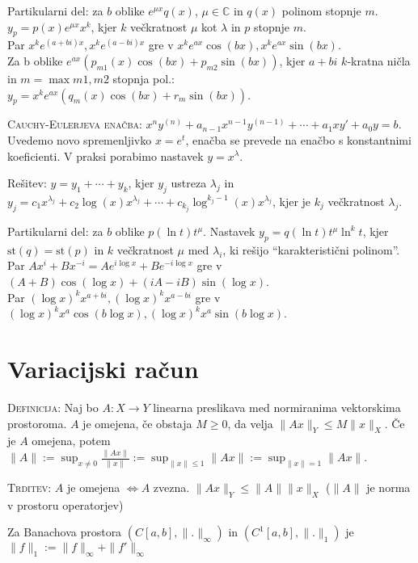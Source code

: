 \documentclass[8pt,a4paper]{amsart}
\theoremstyle{definition} %
\theoremstyle{plain} %
\newcommand{\C}{\mathbb C}
\begin{document}
Partikularni del:
za $b$ oblike $e^{\mu x}q(x)$, $\mu \in \C$ in $q(x)$ polinom stopnje $m$.
$y_p = p(x)e^{\mu x}x^k$, kjer $k$ večkratnost $\mu$ kot $\lambda$ in $p$ stopnje $m$.\\
Par $x^k e^{(a + bi) x},  x^k e^{(a - bi) x}$ gre v $x^k e^{ax} \cos(bx), x^k e^{ax} \sin(bx)$.\\
Za b oblike $e^{ax} (p_{m1}(x) \cos(bx) + p_{m2} \sin(bx))$, kjer $a + bi$ $k$-kratna ničla in $m = \max{m1, m2}$ stopnja pol.: $y_p =x^k e^{ax} (q_{m}(x) \cos(bx) +r_{m} \sin(bx))$.

\textsc{Cauchy-Eulerjeva enačba:} $x^n y^{(n)}+a_{n-1}x^{n-1}y^{(n-1)}+\cdots +
a_1xy' + a_0 y = b$. Uvedemo novo spremenljivko $x = e^t$, enačba se prevede na
enačbo s konstantnimi koeficienti. V praksi porabimo nastavek $y = x^{\lambda}$.

\hspace{3em} Rešitev: $y = y_1+\cdots +y_k$, kjer $y_j$ ustreza $\lambda_j$ in $y_j = c_1
x^{\lambda_j}+c_2 \log(x) x^{\lambda_j}+\cdots + c_{k_j} \log^{k_j -1}(x)
x^{\lambda_j}$, kjer je $k_j$ večkratnost $\lambda_j$.

Partikularni del: za $b$ oblike $p(\ln{t})t^{\mu}$. Nastavek $y_p =
q(\ln{t})t^{\mu}\ln^k{t}$, kjer $\text{st}(q)= \text{st}(p)$ in $k$ večkratnost
$\mu$ med $\lambda_i$, ki rešijo ``karakteristični polinom''.\\
Par $A x^i + B x^{-i} = A e^{i \log x} + Be^{-i \log x}$ gre v $(A + B) \cos(\log x) + (i A - i B) \sin(\log x)$.\\
Par $(\log x)^k x^{a + bi},  (\log x)^k x^{a - bi}$ gre v $(\log x)^k x^{a} \cos(b \log x), (\log x)^k x^{a} \sin(b \log x)$.


\section*{\textbf{Variacijski račun}}

\textsc{Definicija: }Naj bo $A:X \longrightarrow Y$ linearna preslikava med
normiranima vektorskima prostoroma. $A$ je omejena, če obstaja $M \geq 0$, da
velja $\| Ax \|_Y \leq M \|x \|_X$. Če je $A$ omejena, potem $\| A \| := \sup_{x
\neq 0}{\frac{\| Ax \|}{\| x \|}} := \sup_{\| x\| \leq 1}{\| Ax \|} := \sup_{\|
x\| = 1}{\| Ax \|}$.

\textsc{Trditev:} $A$ je omejena $\Longleftrightarrow A$ zvezna. $\| Ax \|_Y
\leq \|A\| \|x\|_X$ ($\|A\|$ je norma v prostoru operatorjev)

Za Banachova prostora $(C[a,b],\|.\|_\infty)$ in $(C^1[a,b],\|.\|_1)$ je $\|f\|_1 := \|f\|_\infty + \|f'\|_\infty$
\end{document}
